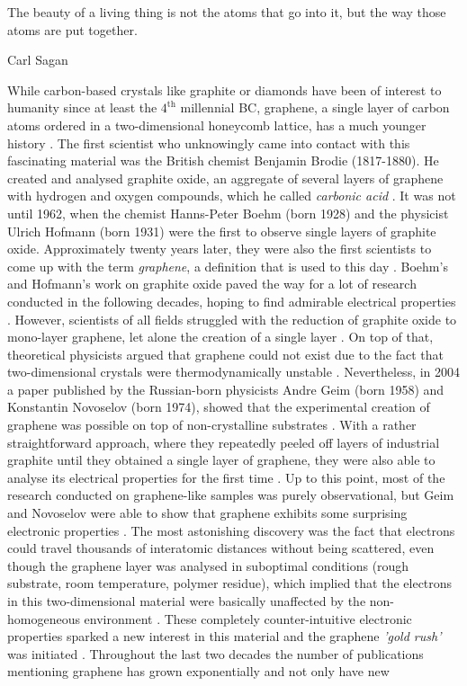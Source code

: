 

\epigraph{The beauty of a living thing is not the atoms that go into it, but the way those atoms are put together.}{Carl Sagan \cite{Sagan1980}}

While carbon-based crystals like graphite or diamonds have been of interest to humanity since at least the $4^\mathrm{th}$ millennial BC, graphene, a single layer of carbon atoms ordered in a two-dimensional honeycomb lattice, has a much younger history \cite{Singh2011}. The first scientist who unknowingly came into contact with this fascinating material was the British chemist Benjamin Brodie (1817-1880). He created and analysed graphite oxide, an aggregate of several layers of graphene with hydrogen and oxygen compounds, which he called \textit{carbonic acid} \cite{Geim2012GraphenePrehistory}. It was not until 1962, when the chemist Hanns-Peter Boehm (born 1928) and the physicist Ulrich Hofmann (born 1931) were the first to observe single layers of graphite oxide. Approximately twenty years later, they were also the first scientists to come up with the term \textit{graphene}, a definition that is used to this day \cite{Geim2012GraphenePrehistory,Dreyer2010}. Boehm's and Hofmann's work on graphite oxide paved the way for a lot of research conducted in the following decades, hoping to find admirable electrical properties \cite{Singh2011}. However, scientists of all fields struggled with the reduction of graphite oxide to mono-layer graphene, let alone the creation of a single layer \cite{Singh2011}. On top of that, theoretical physicists argued that graphene could not exist due to the fact that two-dimensional crystals were thermodynamically unstable \cite{Singh2011, Geim2007}. Nevertheless, in 2004 a paper \cite{Novoselov2004} published by the Russian-born physicists Andre Geim (born 1958) and Konstantin Novoselov (born 1974), showed that the experimental creation of graphene was possible on top of non-crystalline substrates \cite{Geim2007}. With a rather straightforward approach, where they repeatedly peeled off layers of industrial graphite until they obtained a single layer of graphene, they were also able to analyse its electrical properties for the first time \cite{Singh2011, Novoselov2004}. Up to this point, most of the research conducted on graphene-like samples was purely observational, but Geim and Novoselov were able to show that graphene exhibits some surprising electronic properties \cite{Geim2012GraphenePrehistory, Novoselov2004}. The most astonishing discovery was the fact that electrons could travel thousands of interatomic distances without being scattered, even though the graphene layer was analysed in suboptimal conditions (rough substrate, room temperature, polymer residue), which implied that the electrons in this two-dimensional material were basically unaffected by the non-homogeneous environment \cite{Geim2012GraphenePrehistory,Geim2007, Novoselov2004}. These completely counter-intuitive electronic properties sparked a new interest in this material and the graphene \textit{'gold rush'} was initiated \cite{Geim2007}. Throughout the last two decades the number of publications mentioning graphene has grown exponentially and not only have new 